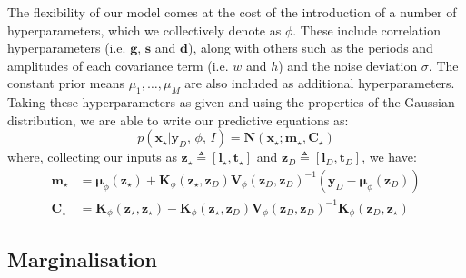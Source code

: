 \documentclass{acmtrans2m}
\newcommand{\p}[2]{p\!\left(\left.#1\right|#2\right)}
\newcommand{\vect}[1]{\boldsymbol{#1}}
\newcommand{\vx}{\vect{x}}
\newcommand{\vxst}{\vx_\star}
\newcommand{\vtst}{\vect{t}_\star}
\newcommand{\vtD}{\vect{t}_D}
\newcommand{\vyD}{\vect{y}_D}
\newcommand{\vlst}{\vect{l}_\star}
\newcommand{\vlD}{\vect{l}_D}
\newcommand{\vzst}{\vect{z}_\star}
\newcommand{\vzD}{\vect{z}_D}
\newcommand{\vmu}{\vect{\mu}}
\newcommand{\mat}[1]{\mathbf{#1}}
\newcommand{\N}[3]{\mat{N}\!\left(#1;#2,#3\right)}
\newcommand{\defequal}{\triangleq}
\begin{document}
The flexibility of our model comes at the cost of the introduction of a number of hyperparameters, which we collectively denote as $\phi$. These include correlation hyperparameters (i.e. $\vect{g}$, $\mat{s}$ and $\vect{d}$), along with others such as the periods and amplitudes of each covariance term (i.e. $w$ and $h$) and the noise deviation $\sigma$. The constant prior means $\mu_1,\ldots,\mu_M$ are also included as additional hyperparameters. Taking these hyperparameters as given and using the properties of the Gaussian distribution, we are able to write our predictive equations as:
\begin{equation} \label{eq:GPMeanVar}
\p{\vxst}{\vyD,\,\phi,\,I}=\N{\vxst}{\vect{m}_\star}{\mat{C}_\star}
\end{equation}
where, collecting our inputs as $\vzst\defequal[\vlst,\vtst]$ and $\vzD\defequal[\vlD,\vtD]$, we have:
\small\begin{align} \label{eq:GPMeanVar2}
\vect{m}_\star&=\vmu_\phi(\vzst)+\mat{K}_\phi(\vzst,\vzD)\mat{V}_\phi(\vzD,\vzD)^{-1}(\vyD-\vect{\mu}_\phi(\vzD))\nonumber\\
\mat{C}_\star&=\mat{K}_\phi(\vzst,\vzst)-\mat{K}_\phi(\vzst,\vzD)\mat{V}_\phi(\vzD,\vzD)^{-1}\mat{K}_\phi(\vzD,\vzst)
\end{align}\normalsize

\subsection{Marginalisation}
\end{document}
